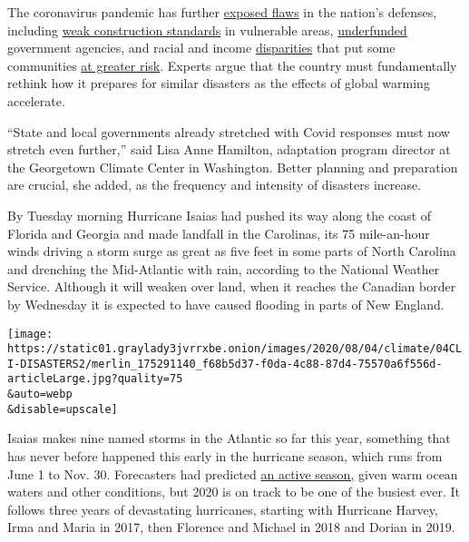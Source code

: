 The coronavirus pandemic has further
\href{https://www.nytimes3xbfgragh.onion/2020/05/22/climate/fema-volunteer-disaster-response.html}{exposed
flaws} in the nation's defenses, including
\href{https://www.nytimes3xbfgragh.onion/2019/10/26/climate/building-codes-secret-deal.html}{weak
construction standards} in vulnerable areas,
\href{https://newrepublic.com/article/158486/towns-arent-equipped-handle-climate-emergencies}{underfunded}
government agencies, and racial and income
\href{https://www.nytimes3xbfgragh.onion/2020/05/17/climate/pollution-poverty-coronavirus.html}{disparities}
that put some communities
\href{https://www.nytimes3xbfgragh.onion/2020/07/24/climate/houston-flooding-race.html}{at
greater risk}. Experts argue that the country must fundamentally rethink
how it prepares for similar disasters as the effects of global warming
accelerate.

``State and local governments already stretched with Covid responses
must now stretch even further,'' said Lisa Anne Hamilton, adaptation
program director at the Georgetown Climate Center in Washington. Better
planning and preparation are crucial, she added, as the frequency and
intensity of disasters increase.

By Tuesday morning Hurricane Isaias had pushed its way along the coast
of Florida and Georgia and made landfall in the Carolinas, its 75
mile-an-hour winds driving a storm surge as great as five feet in some
parts of North Carolina and drenching the Mid-Atlantic with rain,
according to the National Weather Service. Although it will weaken over
land, when it reaches the Canadian border by Wednesday it is expected to
have caused flooding in parts of New England.

\texttt{[image: https://static01.graylady3jvrrxbe.onion/images/2020/08/04/climate/04CLI-DISASTERS2/merlin\_175291140\_f68b5d37-f0da-4c88-87d4-75570a6f556d-articleLarge.jpg?quality=75\\\&auto=webp\\\&disable=upscale]}

Isaias makes nine named storms in the Atlantic so far this year,
something that has never before happened this early in the hurricane
season, which runs from June 1 to Nov. 30. Forecasters had predicted
\href{https://www.nytimes3xbfgragh.onion/2020/05/21/climate/hurricane-season-2020-noaa.html}{an
active season,} given warm ocean waters and other conditions, but 2020
is on track to be one of the busiest ever. It follows three years of
devastating hurricanes, starting with Hurricane Harvey, Irma and Maria
in 2017, then Florence and Michael in 2018 and Dorian in 2019.

